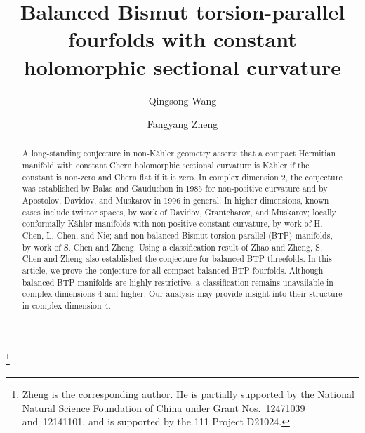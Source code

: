 \documentclass{amsart}
\begin{document}
\title[Balanced Bismut torsion-parallel fourfolds with constant holomorphic sectional curvature]{Balanced Bismut torsion-parallel fourfolds with constant holomorphic sectional curvature}


\author{Qingsong Wang}
\address{Qingsong Wang. Hal{\i}c{\i}o\u{g}lu Data Science Institute, University of California San Diego, La Jolla, CA 92093, USA}
\thanks{Zheng is the corresponding author. He is partially supported by the National Natural Science Foundation of China
under Grant Nos.~12471039 and~12141101, and is supported by the 111 Project D21024.}
	

\author{Fangyang Zheng}
\address{Fangyang Zheng. School of Mathematical Sciences, Chongqing Normal University, Chongqing 401331, China}



\begin{abstract}
A long-standing conjecture in non-K\"ahler geometry asserts that a compact Hermitian manifold with constant Chern holomorphic sectional curvature is K\"ahler if the constant is non-zero and Chern flat if it is zero. In complex dimension $2$, the conjecture was established by Balas and Gauduchon in 1985 for non-positive curvature and by Apostolov, Davidov, and Muskarov in 1996 in general. In higher dimensions, known cases include twistor spaces, by work of Davidov, Grantcharov, and Muskarov; locally conformally K\"ahler manifolds with non-positive constant curvature, by work of H. Chen, L. Chen, and Nie; and non-balanced Bismut torsion parallel (BTP) manifolds, by work of S. Chen and Zheng. Using a classification result of Zhao and Zheng, S. Chen and Zheng also established the conjecture for balanced BTP threefolds. In this article, we prove the conjecture for all compact balanced BTP fourfolds. Although balanced BTP manifolds are highly restrictive, a classification remains unavailable in complex dimensions $4$ and higher. Our analysis may provide insight into their structure in complex dimension $4$.
\end{abstract}


\maketitle
\end{document}

